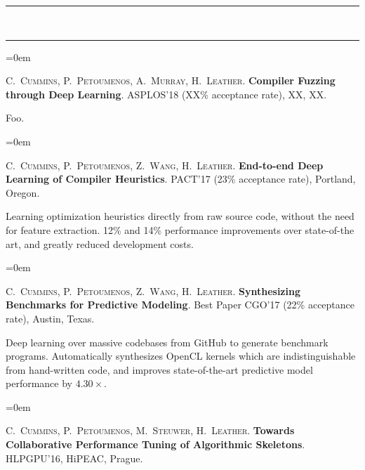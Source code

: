 \documentclass[a4paper,11pt,hidelinks]{scrartcl}
\newcommand{\MarginText}[1]{\marginpar{\raggedleft\itshape\normalsize#1}}
\newcommand{\Title}[1]{\noindent\rule{15cm}{0.4pt}\vspace{-.45em}\\
\noindent\spacedlowsmallcaps{\color{titlecolour}{#1}}

\vspace{-.85em}\noindent\rule{15cm}{0.4pt}\vspace{.2em}}
\newcommand{\Description}[1]{\hangindent=0em\hangafter=0%
\noindent\normalsize{#1}\vspace{1em}}
\newcommand{\Publication}[5]{\Description{\MarginText{#1}#2. \textbf{\href{#5}{#3}}. #4.}}
\begin{document}
\begin{cv}
{  %
}


\newpage


\Title{Publications}

\Description{\MarginText{\textit{2018}}C.\ \textsc{Cummins}, P.\
  \textsc{Petoumenos}, A.\ \textsc{Murray}, H.\
  \textsc{Leather}. \textbf{Compiler Fuzzing through Deep Learning}. ASPLOS'18 (XX\% acceptance rate), XX, XX.\@
  \newline\vspace{-.8em}

  \noindent %
  Foo.%
}

\Description{\MarginText{\textit{2017}}C.\ \textsc{Cummins}, P.\
  \textsc{Petoumenos}, Z.\ \textsc{Wang}, H.\
  \textsc{Leather}. \textbf{End-to-end Deep Learning of Compiler Heuristics}. PACT'17 (23\% acceptance rate), Portland, Oregon.\@
  \newline\vspace{-.8em}

  \noindent %
  Learning optimization heuristics directly from raw source code, without the need for feature extraction. 12\% and 14\% performance improvements over state-of-the art, and greatly reduced development costs. %
}

\Description{\MarginText{2017}C.\ \textsc{Cummins}, P.\
  \textsc{Petoumenos}, Z.\ \textsc{Wang}, H.\
  \textsc{Leather}. \textbf{Synthesizing Benchmarks for Predictive Modeling}. Best Paper CGO'17 (22\% acceptance rate), Austin, Texas.\@
  \newline\vspace{-.8em}

  \noindent %
  Deep learning over massive codebases from GitHub to generate benchmark programs. Automatically synthesizes OpenCL kernels which are indistinguishable from hand-written code, and improves state-of-the-art predictive model performance by $4.30\times$.%
}

\Description{\MarginText{2016}C.\ \textsc{Cummins}, P.\
  \textsc{Petoumenos}, M.\ \textsc{Steuwer}, H.\
  \textsc{Leather}. \textbf{Towards Collaborative Performance Tuning
    of Algorithmic Skeletons}. HLPGPU'16, HiPEAC, Prague.\@
  \newline\vspace{-.8em}

}
\end{cv}
\end{document}
